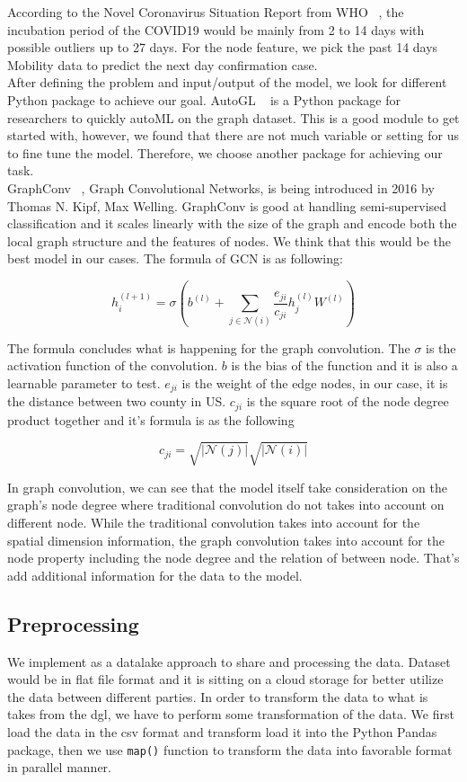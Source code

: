 According to the Novel Coronavirus Situation Report from WHO ~\cite{whocovid19}, the incubation period of the COVID19 would be mainly from 2 to 14 days with possible outliers up to 27 days. For the node feature, we pick the past 14 days Mobility data to predict the next day confirmation case. \\

After defining the problem and input/output of the model, we look for different Python package to achieve our goal. AutoGL ~\cite{guan2021autogl} is a Python package for researchers to quickly autoML on the graph dataset. This is a good module to get started with, however, we found that there are not much variable or setting for us to fine tune the model. Therefore, we choose another package for achieving our task.\\

GraphConv ~\cite{kipf2017semisupervised}, Graph Convolutional Networks, is being introduced in 2016 by Thomas N. Kipf, Max Welling. GraphConv is good at handling semi-supervised classification and it scales linearly with the size of the graph and encode both the local graph structure and the features of nodes. We think that this would be the best model in our cases. The formula of GCN is as following:

\[h_i^{(l+1)} = \sigma(b^{(l)} + \sum_{j\in\mathcal{N}(i)}\frac{e_{ji}}{c_{ji}}h_j^{(l)}W^{(l)})\]

The formula concludes what is happening for the graph convolution. The \(\sigma\) is the activation function of the convolution. \(b\) is the bias of the function and it is also a learnable parameter to test. \(e_{ji}\) is the weight of the edge nodes, in our case, it is the distance between two county in US. \(c_{ji}\) is the square root of the node degree product together and it's formula is as the following

\[c_{ji} = \sqrt{|\mathcal{N}(j)|}\sqrt{|\mathcal{N}(i)|}\]

In graph convolution, we can see that the model itself take consideration on the graph's node degree where traditional convolution do not takes into account on different node. While the traditional convolution takes into account for the spatial dimension information, the graph convolution takes into account for the node property including the node degree and the relation of between node. That's add additional information for the data to the model.

\subsection{Preprocessing}
We implement as a datalake approach to share and processing the data. Dataset would be in flat file format and it is sitting on a cloud storage for better utilize the data between different parties. In order to transform the data to what is takes from the dgl, we have to perform some transformation of the data. We first load the data in the csv format and transform load it into the Python Pandas package, then we use \texttt{map()} function to transform the data into favorable format in parallel manner.\\

